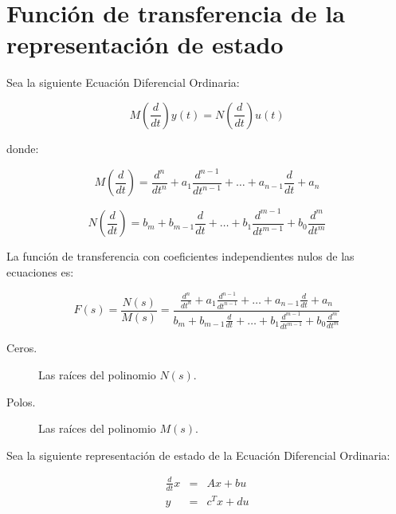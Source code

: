 
    \newpage
    \section{Función de transferencia de la representación de estado}

        Sea la siguiente Ecuación Diferencial Ordinaria:

        \begin{equation}
            M \left( \frac{d}{dt} \right) y(t) = N \left( \frac{d}{dt} \right) u(t) \nonumber
        \end{equation}

        donde:

        \begin{equation*}
            M \left( \frac{d}{dt} \right) = \frac{d^n}{dt^n} + a_1 \frac{d^{n-1}}{dt^{n-1}} + \dots + a_{n-1} \frac{d}{dt} + a_n
        \end{equation*}

        \begin{equation*}
            N \left( \frac{d}{dt} \right) = b_m + b_{m-1} \frac{d}{dt} + \dots + b_1 \frac{d^{m-1}}{dt^{m-1}} + b_0 \frac{d^m}{dt^m}
        \end{equation*}

        La función de transferencia con coeficientes independientes nulos de las ecuaciones es:

        \begin{equation}
            F(s) = \frac{N(s)}{M(s)} = \frac{\frac{d^n}{dt^n} + a_1 \frac{d^{n-1}}{dt^{n-1}} + \dots + a_{n-1} \frac{d}{dt} + a_n}{b_m + b_{m-1} \frac{d}{dt} + \dots + b_1 \frac{d^{m-1}}{dt^{m-1}} + b_0 \frac{d^m}{dt^m}}
        \end{equation}

        \begin{description}
            \item [Ceros.] Las raíces del polinomio $N(s)$.
            \item [Polos.] Las raíces del polinomio $M(s)$.
        \end{description}

        Sea la siguiente representación de estado de la Ecuación Diferencial Ordinaria:

        \begin{eqnarray}
        \frac{d}{dt} x & = & A x + b u \nonumber \\
        y & = & c^T x + d u \nonumber
        \end{eqnarray}

